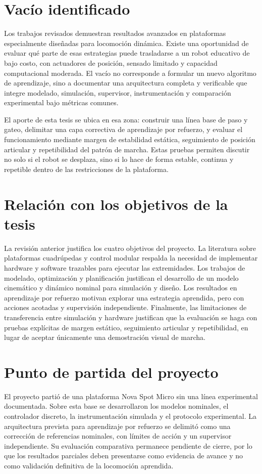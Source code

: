 \section{Vacío identificado}

Los trabajos revisados demuestran resultados avanzados en plataformas
especialmente diseñadas para locomoción dinámica. Existe una oportunidad de
evaluar qué parte de esas estrategias puede trasladarse a un robot educativo de
bajo costo, con actuadores de posición, sensado limitado y capacidad
computacional moderada. El vacío no corresponde a formular un nuevo algoritmo de
aprendizaje, sino a documentar una arquitectura completa y verificable que
integre modelado, simulación, supervisor, instrumentación y comparación
experimental bajo métricas comunes.

El aporte de esta tesis se ubica en esa zona: construir una línea base de paso
y gateo, delimitar una capa correctiva de aprendizaje por refuerzo, y evaluar
el funcionamiento mediante margen de estabilidad estática, seguimiento de
posición articular y repetibilidad del patrón de marcha. Estas pruebas permiten
discutir no solo si el robot se desplaza, sino si lo hace de forma estable,
continua y repetible dentro de las restricciones de la plataforma.

\section{Relación con los objetivos de la tesis}

La revisión anterior justifica los cuatro objetivos del proyecto. La literatura
sobre plataformas cuadrúpedas y control modular respalda la necesidad de
implementar hardware y software trazables para ejecutar las extremidades. Los
trabajos de modelado, optimización y planificación justifican el desarrollo de
un modelo cinemático y dinámico nominal para simulación y diseño. Los resultados
en aprendizaje por refuerzo motivan explorar una estrategia aprendida, pero con
acciones acotadas y supervisión independiente. Finalmente, las limitaciones de
transferencia entre simulación y hardware justifican que la evaluación se haga
con pruebas explícitas de margen estático, seguimiento articular y
repetibilidad, en lugar de aceptar únicamente una demostración visual de marcha.

\section{Punto de partida del proyecto}

El proyecto partió de una plataforma Nova Spot Micro sin una línea experimental
documentada. Sobre esta base se desarrollaron los modelos nominales, el
controlador discreto, la instrumentación simulada y el protocolo experimental.
La arquitectura prevista para aprendizaje por refuerzo se delimitó como una
corrección de referencias nominales, con límites de acción y un supervisor
independiente. Su evaluación comparativa permanece pendiente de cierre, por lo
que los resultados parciales deben presentarse como evidencia de avance y no
como validación definitiva de la locomoción aprendida.
